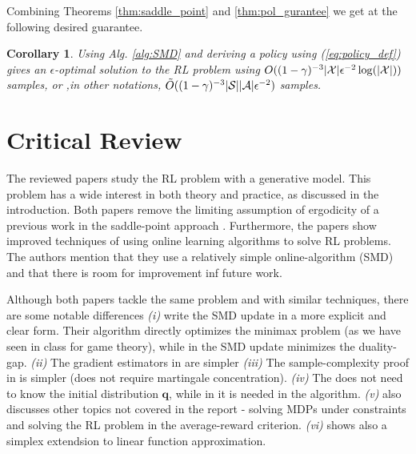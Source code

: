 \documentclass{article}
\newtheorem{corollary}{Corollary}
\DeclarePairedDelimiter\abs{\lvert}{\rvert}%
\newcommand{\States}{\mathcal{S}}
\newcommand{\Actions}{\mathcal{A}}
\newcommand{\nSt}{{\abs{\States}}}
\newcommand{\nAct}{{\abs{\Actions}}}
\newcommand{\nPairs}{{\abs{\mathcal{X}}}}
\newcommand{\initDist}{\boldsymbol{q}}
\begin{document}
Combining Theorems \ref{thm:saddle_point} and \ref{thm:pol_gurantee} we get at the following desired guarantee.

\begin{corollary}
Using Alg. \ref{alg:SMD} and deriving a policy using (\ref{eq:policy_def}) gives an $\epsilon$-optimal solution to the RL problem using $O((1-\gamma)^{-3} \nPairs \epsilon^{-2} \log(\nPairs))$ samples, or ,in other notations, $\tilde{O}((1-\gamma)^{-3} \nSt \nAct \epsilon^{-2})$ samples.
\end{corollary}


\section{Critical Review} \label{sect:CriticReview}

The reviewed papers study the RL problem with a generative model. This problem has a wide interest in both theory and practice, as discussed in the introduction.
Both papers remove the limiting assumption of ergodicity of a previous work in the saddle-point approach \citep{wang2017randomized}.
Furthermore, the papers show improved techniques of using online learning algorithms to solve RL problems. The authors mention that they use a relatively simple online-algorithm (SMD) and that there is room for improvement inf future work. 


Although both papers tackle the same problem and with similar techniques, there are some notable differences \textit{(i)} \citet{jin20efficiently} write the SMD update in a more explicit and clear form. Their algorithm directly optimizes the minimax problem (as we have seen in class for game theory), while in \citet{cheng2020reduction} the SMD update minimizes the duality-gap.  \textit{(ii)} The gradient estimators in  \citet{jin20efficiently} are simpler
 \textit{(iii)}  The sample-complexity proof in \citet{jin20efficiently} is simpler (does not require martingale concentration).
  \textit{(iv)}  The \citet{cheng2020reduction} does not need to know the initial distribution $\initDist$, while  in \citet{jin20efficiently} it is needed in the algorithm.
    \textit{(v)} \citet{jin20efficiently} also discusses other topics not covered in the report - solving MDPs under constraints and solving the RL problem in the average-reward criterion.
    \textit{(vi)}
    \citet{cheng2020reduction} shows also a simplex extendsion to linear function approximation.
\end{document}
